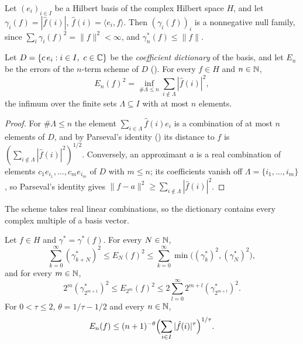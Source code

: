 Let $(e_i)_{i \in I}$ be a Hilbert basis of the complex Hilbert space $H$, and let
$\gamma_i(f) = |\hat f(i)|$, $\hat f(i) = \langle e_i, f \rangle$. Then $(\gamma_i(f))_i$ is a
nonnegative null family, since $\sum_i \gamma_i(f)^2 = \|f\|^2 < \infty$, and
$\gamma^*_n(f) \leq \|f\|$.

\begin{lemma}
\label{lem:nterm-error-hilbert}
\leanok
{}
Let $D = \{c \, e_i : i \in I, \ c \in \mathbb{C}\}$ be the \emph{coefficient dictionary} of the basis,
and let $E_n$ be the errors of the $n$-term scheme of $D$ (). For every
$f \in H$ and $n \in \mathbb{N}$,
\[
  E_n(f)^2 = \inf_{\#\Lambda \leq n} \sum_{i \notin \Lambda} |\hat f(i)|^2 ,
\]
the infimum over the finite sets $\Lambda \subseteq I$ with at most $n$ elements.
\end{lemma}

\begin{proof}
\leanok
{}
For $\#\Lambda \leq n$ the element $\sum_{i \in \Lambda} \hat f(i) e_i$ is a combination of
at most $n$ elements of $D$, and by Parseval's identity () its distance
to $f$ is
$(\sum_{i \notin \Lambda} |\hat f(i)|^2)^{1/2}$. Conversely, an approximant $a$ is a real
combination of elements $c_1 e_{i_1}, \dots, c_m e_{i_m}$ of $D$ with $m \leq n$; its
coefficients vanish off $\Lambda = \{i_1, \dots, i_m\}$, so Parseval's identity gives
$\|f - a\|^2 \geq \sum_{i \notin \Lambda} |\hat f(i)|^2$.
\end{proof}

The scheme takes real linear combinations, so the dictionary contains every complex multiple of
a basis vector.

\begin{lemma}
\label{lem:nterm-tail-bound}
\leanok
{}
Let $f \in H$ and $\gamma^* = \gamma^*(f)$. For every $N \in \mathbb{N}$,
\[
  \sum_{k=0}^\infty (\gamma^*_{k+N})^2 \leq E_N(f)^2 \leq
  \sum_{k=0}^\infty \min\bigl((\gamma^*_k)^2, (\gamma^*_N)^2\bigr),
\]
and for every $m \in \mathbb{N}$,
\[
  2^m (\gamma^*_{2^{m+1}})^2 \leq E_{2^m}(f)^2 \leq
  2 \sum_{l=0}^\infty 2^{m+l} (\gamma^*_{2^{m+l}})^2 .
\]
For $0 < \tau \leq 2$, $\theta = 1/\tau - 1/2$ and every $n \in \mathbb{N}$,
\[
  E_n(f) \leq (n + 1)^{-\theta} \Bigl(\sum_{i \in I} |\hat f(i)|^\tau\Bigr)^{1/\tau} .
\]
\end{lemma}

